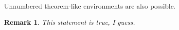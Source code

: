 \documentclass{article}
\newtheorem*{remark}{Remark}
\begin{document}
	Unnumbered theorem-like environments are also possible.
	
	\begin{remark}
		This statement is true, I guess.
	\end{remark}
\end{document}
